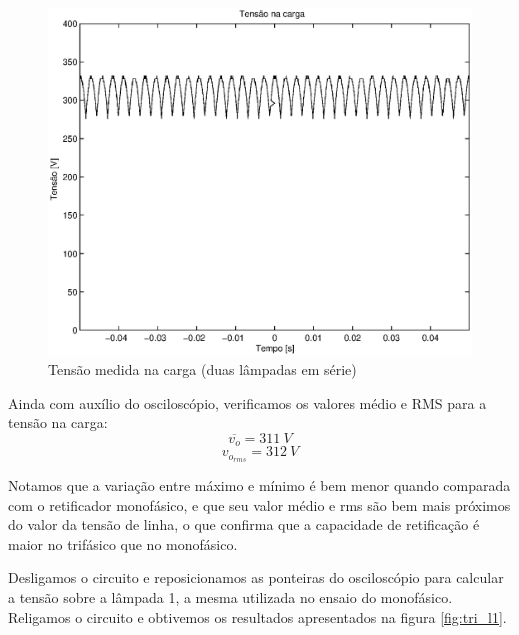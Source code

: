 \documentclass{report}
\begin{document}
\begin{figure}[H]
	\centering
	\includegraphics[width=\linewidth]{dados/trifasico/tri_r}
	\caption{Tensão medida na carga (duas lâmpadas em série)}
	\label{fig:tri_r}
\end{figure}

Ainda com auxílio do osciloscópio, verificamos os valores médio e RMS para a tensão na carga:
\begin{equation}
\overline{v_o} = 311\ V
\end{equation}
\begin{equation}
v_{o_{rms}} = 312\ V
\end{equation}

Notamos que a variação entre máximo e mínimo é bem menor quando comparada com o retificador monofásico, e que seu valor médio e rms são bem mais próximos do valor da tensão de linha, o que confirma que a capacidade de retificação é maior no trifásico que no monofásico.

Desligamos o circuito e reposicionamos as ponteiras do osciloscópio para calcular a tensão sobre a lâmpada 1, a mesma utilizada no ensaio do monofásico. Religamos o circuito e obtivemos os resultados apresentados na figura \ref{fig:tri_l1}.
\end{document}
